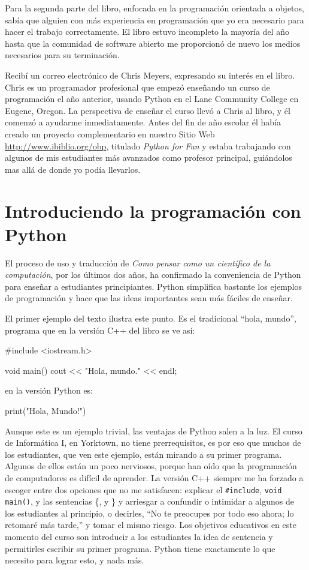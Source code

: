 Para la segunda parte del libro, enfocada en la programación orientada
a objetos, sabía que alguien con más experiencia en programación que
yo era necesario para hacer el trabajo correctamente. El libro estuvo
incompleto la mayoría del año hasta que la comunidad de software abierto
me proporcionó de nuevo los medios necesarios para su terminación.

Recibí un correo electrónico de Chris Meyers, expresando su interés
en el libro. Chris es un programador profesional que empezó enseñando
un curso de programación el año anterior, usando Python en el Lane
Community College en Eugene, Oregon. La perspectiva de enseñar el
curso llevó a Chris al libro, y él comenzó a ayudarme inmediatamente.
Antes del fin de año escolar él había creado un proyecto complementario
en nuestro Sitio Web \url{http://www.ibiblio.org/obp}, titulado {\em
Python for Fun} y estaba trabajando con algunos de mis estudiantes
más avanzados como profesor principal, guiándolos mas allá de donde
yo podía llevarlos.

\section*{Introduciendo la programación con Python}

El proceso de uso y traducción de {\em Como pensar como un científico
de la computación}, por los últimos dos años, ha confirmado la conveniencia
de Python para enseñar a estudiantes principiantes. Python simplifica
bastante los ejemplos de programación y hace que las ideas importantes
sean más fáciles de enseñar.

El primer ejemplo del texto ilustra este punto. Es el tradicional
``hola, mundo'', programa que en la versión C++ del libro se ve
así:

\begin{ccode}
   #include <iostream.h>

   void main()
   {
     cout << "Hola, mundo." << endl;
   }
\end{ccode}

en la versión Python es:

\begin{pythoncode}
    print("Hola, Mundo!")
\end{pythoncode}

Aunque este es un ejemplo trivial, las ventajas de Python salen a
la luz. El curso de Informática I, en Yorktown, no tiene prerrequisitos,
es por eso que muchos de los estudiantes, que ven este ejemplo, están
mirando a su primer programa. Algunos de ellos están un poco nerviosos,
porque han oído que la programación de computadores es difícil de
aprender. La versión C++ siempre me ha forzado a escoger entre dos
opciones que no me satisfacen: explicar el \texttt{\#include}, \texttt{void
main()}, y las sentencias \{, y \} y arriesgar a confundir o intimidar
a algunos de los estudiantes al principio, o decirles, ``No te preocupes
por todo eso ahora; lo retomaré más tarde,'' y tomar el mismo riesgo.
Los objetivos educativos en este momento del curso son introducir
a los estudiantes la idea de sentencia y permitirles escribir su primer
programa. Python tiene exactamente lo que necesito para lograr esto,
y nada más.

